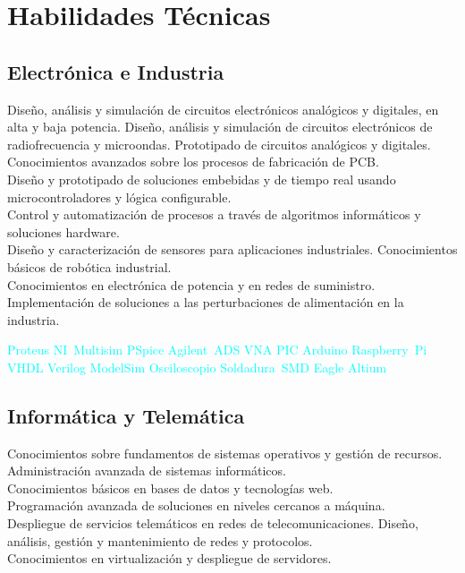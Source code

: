\documentclass[11pt,a4paper,sans,spanish]{moderncv}
\begin{document}


 
\section{Habilidades Técnicas}

\subsection{Electrónica e Industria}
Diseño, análisis y simulación de circuitos electrónicos analógicos y digitales, en alta y baja potencia. 
Diseño, análisis y simulación de circuitos electrónicos de radiofrecuencia y microondas.
Prototipado de circuitos analógicos y digitales. Conocimientos avanzados sobre los procesos de fabricación de PCB.
\protect\\[0.3em]
Diseño y prototipado de soluciones embebidas y de tiempo real usando microcontroladores y lógica configurable.
\protect\\[0.3em]
Control y automatización de procesos a través de algoritmos informáticos y soluciones hardware.
\protect\\[0.3em]
Diseño y caracterización de sensores para aplicaciones industriales. Conocimientos básicos de robótica industrial.
\protect\\[0.3em]
Conocimientos en electrónica de potencia y en redes de suministro. Implementación de soluciones a las perturbaciones de alimentación en la industria.

\begin{center}
\textcolor{cyan}{
Proteus \quad{} NI~Multisim \quad{} PSpice \quad{} Agilent~ADS \quad{} VNA \quad{} PIC \quad{} Arduino \quad{} Raspberry~Pi \quad{} VHDL \quad{} Verilog \quad{} ModelSim \quad{} Osciloscopio \quad{} Soldadura~SMD \quad{} Eagle \quad{} Altium
}
\end{center}

\subsection{Informática y Telemática}
Conocimientos sobre fundamentos de sistemas operativos y gestión de recursos.
Administración avanzada de sistemas informáticos.
\protect\\[0.3em]
Conocimientos básicos en bases de datos y tecnologías web.
\protect\\[0.3em]
Programación avanzada de soluciones en niveles cercanos a máquina.
\protect\\[0.3em]
Despliegue de servicios telemáticos en redes de telecomunicaciones. Diseño, análisis, gestión y mantenimiento de redes y protocolos.
\protect\\[0.3em]
Conocimientos en virtualización y despliegue de servidores.
\end{document}
